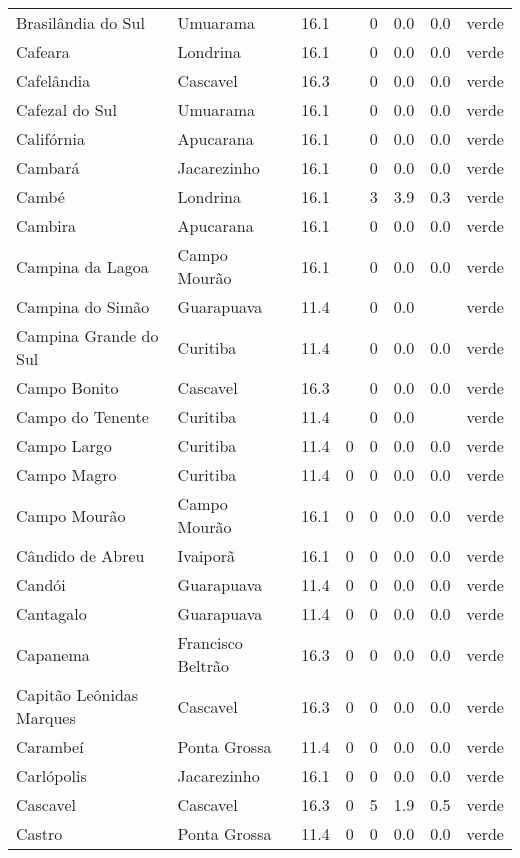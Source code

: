 \begin{longtable}{l|lllllll}
  Brasilândia do Sul & Umuarama & 16.1 &  & 0 & 0.0 & 0.0 & verde \\ 
  Cafeara & Londrina & 16.1 &  & 0 & 0.0 & 0.0 & verde \\ 
  Cafelândia & Cascavel & 16.3 &  & 0 & 0.0 & 0.0 & verde \\ 
  Cafezal do Sul & Umuarama & 16.1 &  & 0 & 0.0 & 0.0 & verde \\ 
  Califórnia & Apucarana & 16.1 &  & 0 & 0.0 & 0.0 & verde \\ 
  Cambará & Jacarezinho & 16.1 &  & 0 & 0.0 & 0.0 & verde \\ 
  Cambé & Londrina & 16.1 &  & 3 & 3.9 & 0.3 & verde \\ 
  Cambira & Apucarana & 16.1 &  & 0 & 0.0 & 0.0 & verde \\ 
  Campina da Lagoa & Campo Mourão & 16.1 &  & 0 & 0.0 & 0.0 & verde \\ 
  Campina do Simão & Guarapuava & 11.4 &  & 0 & 0.0 &  & verde \\ 
  Campina Grande do Sul & Curitiba & 11.4 &  & 0 & 0.0 & 0.0 & verde \\ 
  Campo Bonito & Cascavel & 16.3 &  & 0 & 0.0 & 0.0 & verde \\ 
  Campo do Tenente & Curitiba & 11.4 &  & 0 & 0.0 &  & verde \\ 
  Campo Largo & Curitiba & 11.4 & 0 & 0 & 0.0 & 0.0 & verde \\ 
  Campo Magro & Curitiba & 11.4 & 0 & 0 & 0.0 & 0.0 & verde \\ 
  Campo Mourão & Campo Mourão & 16.1 & 0 & 0 & 0.0 & 0.0 & verde \\ 
  Cândido de Abreu & Ivaiporã & 16.1 & 0 & 0 & 0.0 & 0.0 & verde \\ 
  Candói & Guarapuava & 11.4 & 0 & 0 & 0.0 & 0.0 & verde \\ 
  Cantagalo & Guarapuava & 11.4 & 0 & 0 & 0.0 & 0.0 & verde \\ 
  Capanema & Francisco Beltrão & 16.3 & 0 & 0 & 0.0 & 0.0 & verde \\ 
  Capitão Leônidas Marques & Cascavel & 16.3 & 0 & 0 & 0.0 & 0.0 & verde \\ 
  Carambeí & Ponta Grossa & 11.4 & 0 & 0 & 0.0 & 0.0 & verde \\ 
  Carlópolis & Jacarezinho & 16.1 & 0 & 0 & 0.0 & 0.0 & verde \\ 
  Cascavel & Cascavel & 16.3 & 0 & 5 & 1.9 & 0.5 & verde \\ 
  Castro & Ponta Grossa & 11.4 & 0 & 0 & 0.0 & 0.0 & verde \\ 

\end{longtable}
